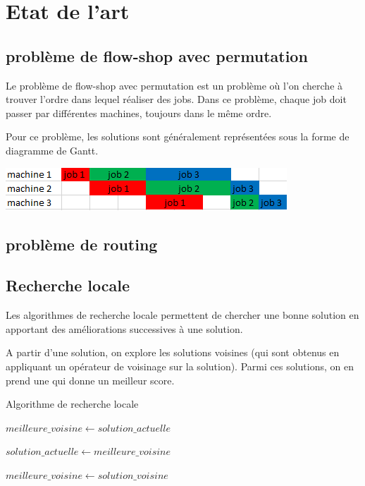\chapter{Etat de l'art}

\section{problème de flow-shop avec permutation}
Le problème de flow-shop avec permutation est un problème où l'on cherche à trouver l'ordre dans lequel réaliser des jobs.
Dans ce problème, chaque job doit passer par différentes machines, toujours dans le même ordre.

Pour ce problème, les solutions sont généralement représentées sous la forme de diagramme de Gantt.

\includegraphics{parts/etat_de_l_art/gantt_exemple.png}

\section{problème de routing}
\section{Recherche locale}
\label{section:recherche_locale}

Les algorithmes de recherche locale permettent de chercher une bonne solution en apportant des améliorations successives à une solution.

A partir d'une solution, on explore les solutions voisines (qui sont obtenus en appliquant un opérateur de voisinage sur la solution).
Parmi ces solutions, on en prend une qui donne un meilleur score.

\begin{algorithm}
	\caption{Algorithme de recherche locale} 
	\label{algo:recherche_locale}

	$meilleure\_voisine \gets solution\_actuelle$

	{
		$solution\_actuelle \gets meilleure\_voisine$

		{
			{
				$meilleure\_voisine \gets solution\_voisine$
			}
		}
	}
\end{algorithm}